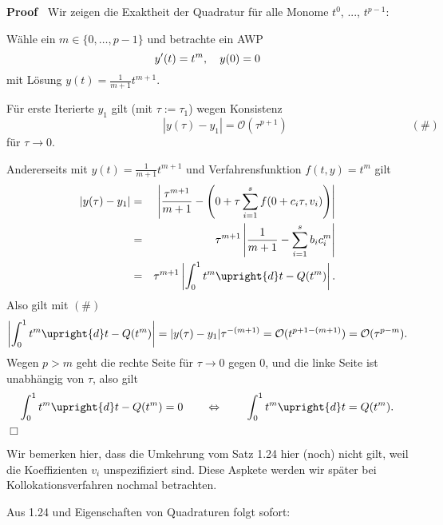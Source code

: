 \documentclass{book}
\newcommand{\assign}{:=}
\newcommand{\textdots}{...}
\newenvironment{proof}{\noindent\textbf{Proof\ }}{\hspace*{\fill}$\Box$\medskip}
\begin{document}
\begin{proof}
  Wir zeigen die Exaktheit der Quadratur f{\"u}r alle Monome $t^0$,
  {\textdots}, $t^{p - 1}$:
  
  W{\"a}hle ein $m \in \{ 0, \ldots, p - 1 \}$ und betrachte ein AWP
  \[ y' (t) = t^m, \text{\quad} y (0) = 0 \]
  mit L{\"o}sung $y (t) = \frac{1}{m + 1} t^{m + 1} .$
  
  F{\"u}r erste Iterierte $y_1$ gilt (mit $\tau \assign \tau_1$) wegen
  Konsistenz
  \[ \hspace{3em} \hspace{3em} \quad \hspace{4em} \hspace{3em} | y (\tau) -
     y_1 | =\mathcal{O} (\tau^{p + 1}) \hspace{3em} \hspace{3em} \qquad
     \hspace{3em} (\#) \]
  f{\"u}r $\tau \rightarrow 0$.
  
  Andererseits mit $y (t) = \frac{1}{m + 1} t^{m + 1}$ und Verfahrensfunktion
  $f (t, y) = t^m$ gilt
  \begin{eqnarray*}
    | y (\tau) - y_1 | & = & \left| \frac{\tau^{m + 1}}{m + 1} - \left( 0 +
    \tau \sum_{i = 1}^s f (0 + c_i \tau, v_i) \right) \right|\\
    & = & \tau^{m + 1} \left| \frac{1}{m + 1} - \sum_{i = 1}^s b_i c_i^m
    \right|\\
    & = & \tau^{m + 1} \left| \int_0^1 t^m \upright{d} t - Q (t^m) \right| .
  \end{eqnarray*}
  {\hspace{1.7em}}Also gilt mit $(\#)$
  \[ \left| \int_0^1 t^m \upright{d} t - Q (t^m) \right| = | y (\tau) - y_1 |
     \tau^{- (m + 1)} =\mathcal{O} (t^{p + 1 - (m + 1)}) =\mathcal{O} (\tau^{p
     - m}) . \]
  {\hspace{1.7em}}Wegen $p > m$ geht die rechte Seite f{\"u}r $\tau
  \rightarrow 0$ gegen $0$, und die linke Seite ist unabh{\"a}ngig von $\tau$,
  also gilt
  \[ \int_0^1 t^m \upright{d} t - Q (t^m) = 0 \qquad \Leftrightarrow
     \text{\qquad} \int_0^1 t^m \upright{d} t = Q (t^m) . \]
\end{proof}

Wir bemerken hier, dass die Umkehrung vom Satz 1.24 hier (noch) nicht gilt,
weil die Koeffizienten $v_i$ unspezifiziert sind. Diese Aspkete werden wir
sp{\"a}ter bei Kollokationsverfahren nochmal betrachten.

Aus 1.24 und Eigenschaften von Quadraturen folgt sofort:
\end{document}
